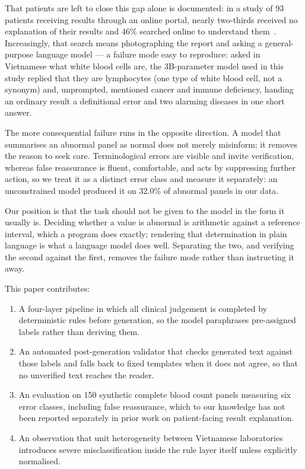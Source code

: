 \documentclass{svproc}
\begin{document}
That patients are left to close this gap alone is documented: in a study of
93 patients receiving results through an online portal, nearly two-thirds
received no explanation of their results and 46\% searched online to
understand them~\cite{giardina2018perceptions}. Increasingly, that search
means photographing the report and asking a general-purpose language
model --- a failure mode easy to reproduce: asked in Vietnamese what white
blood cells are, the 3B-parameter model used in this study replied that
they are lymphocytes (one type of white blood cell, not a synonym) and,
unprompted, mentioned cancer and immune deficiency, handing an ordinary
result a definitional error and two alarming diseases in one short answer.

The more consequential failure runs in the opposite direction. A model
that summarises an abnormal panel as normal does not merely misinform; it
removes the reason to seek care. Terminological errors are visible and
invite verification, whereas false reassurance is fluent, comfortable, and
acts by suppressing further action, so we treat it as a distinct error
class and measure it separately: an unconstrained model produced it on
32.0\% of abnormal panels in our data.

Our position is that the task should not be given to the model in the form
it usually is. Deciding whether a value is abnormal is arithmetic against
a reference interval, which a program does exactly; rendering that
determination in plain language is what a language model does well.
Separating the two, and verifying the second against the first, removes
the failure mode rather than instructing it away.

This paper contributes:

\begin{enumerate}
\item A four-layer pipeline in which all clinical judgement is completed
by deterministic rules before generation, so the model paraphrases
pre-assigned labels rather than deriving them.
\item An automated post-generation validator that checks generated text
against those labels and falls back to fixed templates when it does not
agree, so that no unverified text reaches the reader.
\item An evaluation on 150 synthetic complete blood count panels
measuring six error classes, including false reassurance, which to our
knowledge has not been reported separately in prior work on patient-facing
result explanation.
\item An observation that unit heterogeneity between Vietnamese
laboratories introduces severe misclassification inside the rule layer
itself unless explicitly normalised.
\end{enumerate}
\end{document}
